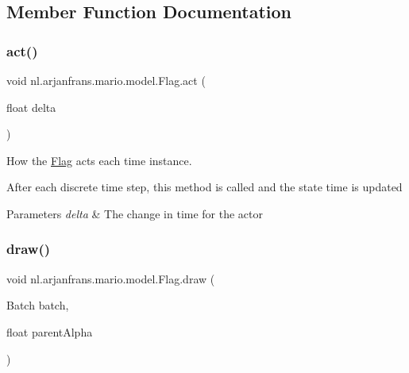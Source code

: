 \subsection{Member Function Documentation}
\mbox{\label{classnl_1_1arjanfrans_1_1mario_1_1model_1_1Flag_a92c1d0b95a46934e2f9b286ca233452a}} 
\subsubsection{\texorpdfstring{act()}{act()}}
{\footnotesize\ttfamily void nl.\+arjanfrans.\+mario.\+model.\+Flag.\+act (\begin{DoxyParamCaption}\item[{float}]{delta }\end{DoxyParamCaption})}



How the \hyperlink{classnl_1_1arjanfrans_1_1mario_1_1model_1_1Flag}{Flag} acts each time instance. 

After each discrete time step, this method is called and the state time is updated 
\begin{DoxyParams}{Parameters}
{\em delta} & The change in time for the actor \\
\hline
\end{DoxyParams}
\mbox{\label{classnl_1_1arjanfrans_1_1mario_1_1model_1_1Flag_a37b444b2cce56fc741f29b12cfb9ebd0}} 
\subsubsection{\texorpdfstring{draw()}{draw()}}
{\footnotesize\ttfamily void nl.\+arjanfrans.\+mario.\+model.\+Flag.\+draw (\begin{DoxyParamCaption}\item[{Batch}]{batch,  }\item[{float}]{parent\+Alpha }\end{DoxyParamCaption})}




